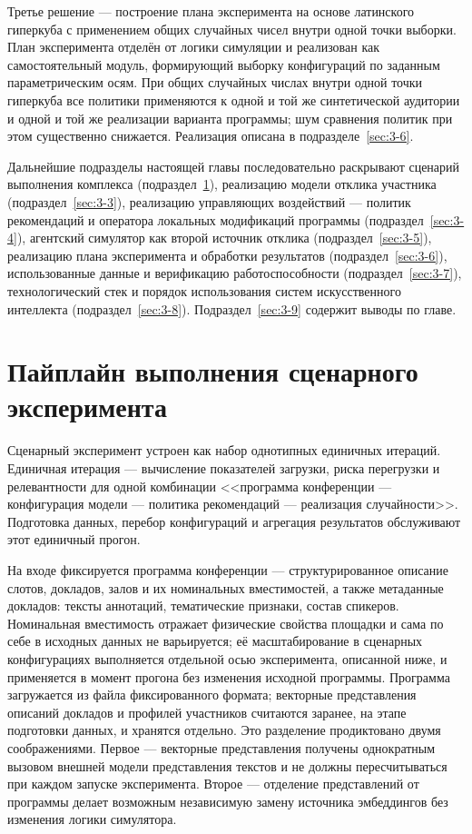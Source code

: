 Третье решение --- построение плана эксперимента на основе латинского гиперкуба с применением общих случайных чисел внутри одной точки выборки. План эксперимента отделён от логики симуляции и реализован как самостоятельный модуль, формирующий выборку конфигураций по заданным параметрическим осям. При общих случайных числах внутри одной точки гиперкуба все политики применяются к одной и той же синтетической аудитории и одной и той же реализации варианта программы; шум сравнения политик при этом существенно снижается. Реализация описана в подразделе~\ref{sec:3-6}.

Дальнейшие подразделы настоящей главы последовательно раскрывают сценарий выполнения комплекса (подраздел~\ref{sec:3-2}), реализацию модели отклика участника (подраздел~\ref{sec:3-3}), реализацию управляющих воздействий --- политик рекомендаций и оператора локальных модификаций программы (подраздел~\ref{sec:3-4}), агентский симулятор как второй источник отклика (подраздел~\ref{sec:3-5}), реализацию плана эксперимента и обработки результатов (подраздел~\ref{sec:3-6}), использованные данные и верификацию работоспособности (подраздел~\ref{sec:3-7}), технологический стек и порядок использования систем искусственного интеллекта (подраздел~\ref{sec:3-8}). Подраздел~\ref{sec:3-9} содержит выводы по главе.


\section{Пайплайн выполнения сценарного эксперимента}
\label{sec:3-2}

Сценарный эксперимент устроен как набор однотипных единичных итераций. Единичная итерация --- вычисление показателей загрузки, риска перегрузки и релевантности для одной комбинации <<программа конференции --- конфигурация модели --- политика рекомендаций --- реализация случайности>>. Подготовка данных, перебор конфигураций и агрегация результатов обслуживают этот единичный прогон.

На входе фиксируется программа конференции --- структурированное описание слотов, докладов, залов и их номинальных вместимостей, а также метаданные докладов: тексты аннотаций, тематические признаки, состав спикеров. Номинальная вместимость отражает физические свойства площадки и сама по себе в исходных данных не варьируется; её масштабирование в сценарных конфигурациях выполняется отдельной осью эксперимента, описанной ниже, и применяется в момент прогона без изменения исходной программы. Программа загружается из файла фиксированного формата; векторные представления описаний докладов и профилей участников считаются заранее, на этапе подготовки данных, и хранятся отдельно. Это разделение продиктовано двумя соображениями. Первое --- векторные представления получены однократным вызовом внешней модели представления текстов и не должны пересчитываться при каждом запуске эксперимента. Второе --- отделение представлений от программы делает возможным независимую замену источника эмбеддингов без изменения логики симулятора.

